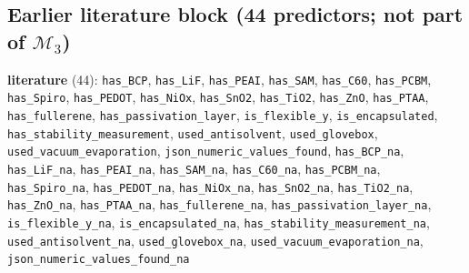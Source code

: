 \documentclass[10pt]{article}
\begin{document}
\subsection*{Earlier literature block (44 predictors; not part of $\mathcal{M}_3$)}
\textbf{literature} (44): \texttt{has\_BCP}, \texttt{has\_LiF}, \texttt{has\_PEAI}, \texttt{has\_SAM}, \texttt{has\_C60}, \texttt{has\_PCBM}, \texttt{has\_Spiro}, \texttt{has\_PEDOT}, \texttt{has\_NiOx}, \texttt{has\_SnO2}, \texttt{has\_TiO2}, \texttt{has\_ZnO}, \texttt{has\_PTAA}, \texttt{has\_fullerene}, \texttt{has\_passivation\_layer}, \texttt{is\_flexible\_y}, \texttt{is\_encapsulated}, \texttt{has\_stability\_measurement}, \texttt{used\_antisolvent}, \texttt{used\_glovebox}, \texttt{used\_vacuum\_evaporation}, \texttt{json\_numeric\_values\_found}, \texttt{has\_BCP\_na}, \texttt{has\_LiF\_na}, \texttt{has\_PEAI\_na}, \texttt{has\_SAM\_na}, \texttt{has\_C60\_na}, \texttt{has\_PCBM\_na}, \texttt{has\_Spiro\_na}, \texttt{has\_PEDOT\_na}, \texttt{has\_NiOx\_na}, \texttt{has\_SnO2\_na}, \texttt{has\_TiO2\_na}, \texttt{has\_ZnO\_na}, \texttt{has\_PTAA\_na}, \texttt{has\_fullerene\_na}, \texttt{has\_passivation\_layer\_na}, \texttt{is\_flexible\_y\_na}, \texttt{is\_encapsulated\_na}, \texttt{has\_stability\_measurement\_na}, \texttt{used\_antisolvent\_na}, \texttt{used\_glovebox\_na}, \texttt{used\_vacuum\_evaporation\_na}, \texttt{json\_numeric\_values\_found\_na}\par\smallskip
\end{document}

